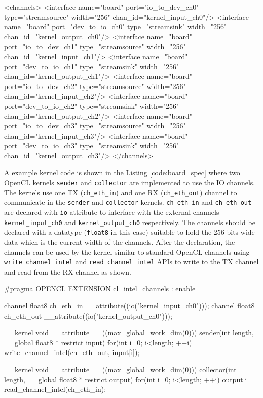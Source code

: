 \begin{XmlCode}[caption=IO channels desciption in \texttt{board\_spec.xml}, frame=tlrb, label=code:board_spec]
<channels>
    <interface name="board" port="io_to_dev_ch0" type="streamsource" width="256" chan_id="kernel_input_ch0"/>
    <interface name="board" port="dev_to_io_ch0" type="streamsink" width="256" chan_id="kernel_output_ch0"/>
    <interface name="board" port="io_to_dev_ch1" type="streamsource" width="256" chan_id="kernel_input_ch1"/>
    <interface name="board" port="dev_to_io_ch1" type="streamsink" width="256" chan_id="kernel_output_ch1"/>
    <interface name="board" port="io_to_dev_ch2" type="streamsource" width="256" chan_id="kernel_input_ch2"/>
    <interface name="board" port="dev_to_io_ch2" type="streamsink" width="256" chan_id="kernel_output_ch2"/>
    <interface name="board" port="io_to_dev_ch3" type="streamsource" width="256" chan_id="kernel_input_ch3"/>
    <interface name="board" port="dev_to_io_ch3" type="streamsink" width="256" chan_id="kernel_output_ch3"/>
</channels>
\end{XmlCode}

A example kernel code is shown in the Listing \ref{code:board_spec} where two OpenCL
kernels \texttt{sender} and \texttt{collector}
are implemented to use the IO channels. The kernels use one TX (\texttt{ch\_eth\_in})
and one RX (\texttt{ch\_eth\_out}) channel to
communicate in the \texttt{sender} and \texttt{collector} kernels.
\texttt{ch\_eth\_in} and \texttt{ch\_eth\_out} are declared with \texttt{io} attribute
to interface with the external channels \texttt{kernel\_input\_ch0} and \texttt{kernel\_output\_ch0} respectively.
The channels should be declared with a datatype (\texttt{float8} in this case)
suitable to hold the 256 bits wide data which is the current width of the channels.
After the declaration, the channels can be used by the kernel similar to standard OpenCL
channels using \texttt{write\_channel\_intel} and \texttt{read\_channel\_intel} APIs to write
to the TX channel and read from the RX channel as shown.

\begin{CppCode}[caption=IO channels usage example in a OpenCL kernel, frame=tlrb, label=code:board_spec, float]
#pragma OPENCL EXTENSION cl_intel_channels : enable

channel float8 ch_eth_in __attribute((io("kernel_input_ch0")));
channel float8 ch_eth_out __attribute((io("kernel_output_ch0")));

__kernel void __attribute__ ((max_global_work_dim(0)))
sender(int length, __global float8 * restrict input)
{
    for(int i=0; i<length; ++i)
        write_channel_intel(ch_eth_out, input[i]);
}

__kernel void __attribute__ ((max_global_work_dim(0)))
collector(int length, __global float8 * restrict output)
{
    for(int i=0; i<length; ++i)
        output[i] = read_channel_intel(ch_eth_in);
}
\end{CppCode}

